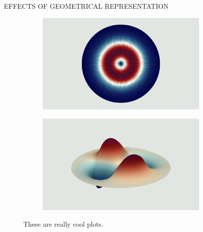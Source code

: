\documentclass[debug]{beamer} %
\newlength{\columnheight}
\begin{document}
\begin{frame}
\begin{columns}
\begin{column}{0.45\textwidth}
{\begin{block}{\boxnumber EFFECTS OF GEOMETRICAL REPRESENTATION}
\begin{figure}[hb]
\begin{mdframed}[backgroundcolor=bggrey]
					\begin{subfigure}[b]{.4\textwidth}
						\centering
						\includegraphics[width=1\linewidth]{images/et3posterStepFiber.png}%
					\end{subfigure}\hfill
					\begin{subfigure}[b]{.4\textwidth}
						\centering
						\includegraphics[width=1\linewidth]{images/ez3posterStepFiber.png}%
					\end{subfigure}
				\end{mdframed}
				\caption{These are really cool plots.}
				\label{fig:plot-step}
			\end{figure}
        \end{block}

        \vfill

      } %
    \end{column}

    \begin{column}{0.45\textwidth}
      \parbox[t][\columnheight]{\textwidth}{

}
\end{column}
\end{columns}
\end{frame}
\end{document}

